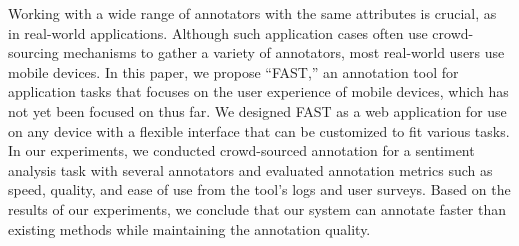 Working with a wide range of annotators with the same attributes is crucial, as in real-world applications. Although such application cases often use crowd-sourcing mechanisms to gather a variety of annotators, most real-world users use mobile devices. In this paper, we propose ``FAST,'' an annotation tool for application tasks that focuses on the user experience of mobile devices, which has not yet been focused on thus far.
We designed FAST as a web application for use on any device with a flexible interface that can be customized to fit various tasks. In our experiments, we conducted crowd-sourced annotation for a sentiment analysis task with several annotators and evaluated annotation metrics such as speed, quality, and ease of use from the tool's logs and user surveys. Based on the results of our experiments, we conclude that our system can annotate faster than existing methods while maintaining the annotation quality.